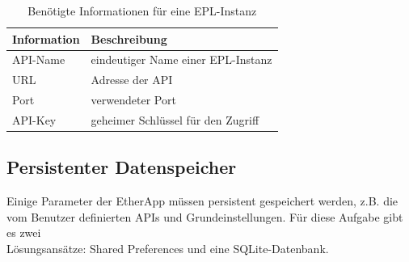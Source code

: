 \begin{table}[h!]
    \begin{center}
      \footnotesize
      \begin{tabular}{|l|l|}
          \hline \textbf{Information} & \textbf{Beschreibung}\\
          \hline
          \hline API-Name & eindeutiger Name einer EPL-Instanz\\
          \hline URL & Adresse der API\\
          \hline Port & verwendeter Port\\
          \hline API-Key & geheimer Schlüssel für den Zugriff\\
          \hline
      \end{tabular}
    \caption{Benötigte Informationen für eine EPL-Instanz}
    \label{tbl:EPLi}
    \end{center}
\end{table}

\subsection{Persistenter Datenspeicher}
Einige Parameter der EtherApp müssen persistent gespeichert werden, z.B. die vom Benutzer definierten APIs und Grundeinstellungen.
Für diese Aufgabe gibt es zwei\\
Lösungsansätze: Shared Preferences und eine SQLite-Datenbank.

